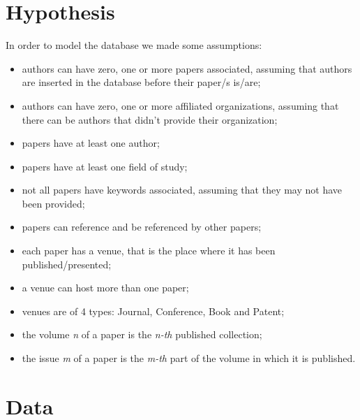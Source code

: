 \documentclass{Configuration_Files/PoliMi3i_thesis}
\begin{document}
\chapter{Hypothesis}
\label{ch:hypothesis}
In order to model the database we made some assumptions:
\begin{itemize}
    \item authors can have zero, one or more papers associated, assuming that authors are inserted in the database before their paper/s is/are;
    \item authors can have zero, one or more affiliated organizations, assuming that there can be authors that didn't provide their organization; 
    \item papers have at least one author;
    \item papers have at least one field of study;
    \item not all papers have keywords associated, assuming that they may not have been provided;
    \item papers can reference and be referenced by other papers;
    \item each paper has a venue, that is the place where it has been published/presented;
    \item a venue can host more than one paper;
    \item venues are of 4 types: Journal, Conference, Book and Patent;
    \item the volume \textit{n} of a paper is the \textit{n-th} published collection;
    \item the issue \textit{m} of a paper is the \textit{m-th} part of the volume in which it is published.
\end{itemize}
\chapter{Data}
\label{ch:data}
\end{document}
